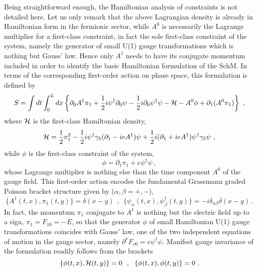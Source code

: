 \documentclass[a4paper,11pt]{article}
\begin{document}
Being straightforward enough, the Hamiltonian analysis of constraints
is not detailed here. Let us only remark that the above Lagrangian density
is already in Hamiltonian form in the fermionic sector,\cite{Gov1,Gov5} 
while $A^0$ is necessarily the Lagrange multiplier for a first-class 
constraint, in fact the sole first-class constraint of the system, namely 
the generator of small U(1) gauge transformations which is nothing but 
Gauss' law.\cite{Gov1} Hence only $A^1$ needs to have its conjugate momentum 
included in order to identify the basic Hamiltonian formulation\cite{Gov1} 
of the SchM. In terms of the corresponding first-order action on phase space, 
this formulation is defined by
\begin{equation}
S=\int dt\int_0^L dx\left\{\partial_0A^1\pi_1+
\frac{1}{2}i\psi^\dagger\partial_0\psi-\frac{1}{2}i\partial_0\psi^\dagger\psi
-{\cal H}-A^0\phi+\partial_1(A^0\pi_1)\right\}\ ,
\label{eq:SH}
\end{equation}
where ${\cal H}$ is the first-class Hamiltonian density,
\begin{equation}
{\cal H}=\frac{1}{2}\pi^2_1
-\frac{1}{2}i\psi^\dagger\gamma_5(\partial_1-ieA^1)\psi
+\frac{1}{2}i(\partial_1+ieA^1)\psi^\dagger\gamma_5\psi\ ,
\label{eq:firstH}
\end{equation}
while $\phi$ is the first-class constraint of the system,
\begin{equation}
\phi=\partial_1\pi_1+e\psi^\dagger\psi\ ,
\label{eq:firstconstraint}
\end{equation}
whose Lagrange multiplier is nothing else than the time component $A^0$
of the gauge field. This first-order action encodes the 
fundamental Grassmann graded Poisson bracket structure given by
($\alpha,\beta=+,-$),
\begin{equation}
\{A^1(t,x),\pi_1(t,y)\}=\delta(x-y)\ \ ,\ \ 
\{\psi_\alpha(t,x),\psi^\dagger_\beta(t,y)\}=-i\delta_{\alpha\beta}
\delta(x-y)\ .
\end{equation}
In fact, the momentum $\pi_1$ conjugate to $A^1$ is nothing but the electric
field up to a sign, $\pi_1=F_{10}=-E$, so that the generator $\phi$ of small
Hamiltonian U(1) gauge transformations coincides with Gauss' law, one of the
two independent equations of motion in the gauge sector, namely
$\partial^\nu F_{\nu 0}=e\psi^\dagger\psi$. Manifest gauge 
invariance of the formulation readily follows from the brackets
\begin{equation}
\{\phi(t,x),{\cal H}(t,y)\}=0\ \ ,\ \ 
\{\phi(t,x),\phi(t,y)\}=0\ .
\end{equation}
\end{document}
